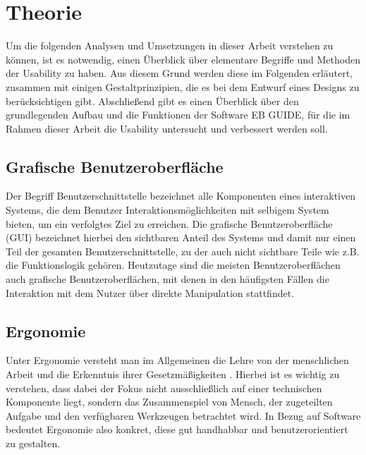 \chapter{Theorie}\label{ch:data}
Um die folgenden Analysen und Umsetzungen in dieser Arbeit verstehen zu können, ist es notwendig, einen Überblick über elementare Begriffe und Methoden der Usability zu haben.
Aus diesem Grund werden diese im Folgenden  erläutert, zusammen mit einigen Gestaltprinzipien, die es bei dem Entwurf eines Designs zu berücksichtigen gibt.
Abschließend gibt es einen Überblick über den grundlegenden Aufbau und die Funktionen der Software EB GUIDE, für die im Rahmen dieser Arbeit die Usability untersucht und verbessert werden soll.

\section{Grafische Benutzeroberfläche}
Der Begriff \glqq Benutzerschnittstelle\grqq{} bezeichnet alle Komponenten eines interaktiven Systems, die dem Benutzer Interaktionsmöglichkeiten mit selbigem System bieten, um ein verfolgtes Ziel zu erreichen.
Die grafische Benutzeroberfläche (GUI) bezeichnet hierbei den sichtbaren Anteil des Systems und damit nur einen Teil der gesamten Benutzerschnittstelle, zu der auch nicht sichtbare Teile wie z.B. die Funktionslogik gehören\cite{Sarodnick.2016}.
Heutzutage sind die meisten Benutzeroberflächen auch grafische Benutzeroberflächen, mit denen in den häufigsten Fällen die Interaktion mit dem Nutzer über direkte Manipulation stattfindet\cite{Nielsen.1995?}.

\section{Ergonomie}
Unter Ergonomie versteht man im Allgemeinen die \glqq Lehre von der menschlichen Arbeit und die Erkenntnis ihrer Gesetzmäßigkeiten\grqq{} \cite{Bullinger.1994}.
Hierbei ist es wichtig zu verstehen, dass dabei der Fokus nicht ausschließlich auf einer technischen Komponente liegt, sondern das Zusammenspiel von Mensch, der zugeteilten Aufgabe und den verfügbaren Werkzeugen betrachtet wird\cite{Sarodnick.2016}.
In Bezug auf Software bedeutet Ergonomie also konkret, diese gut handhabbar und benutzerorientiert zu gestalten.


